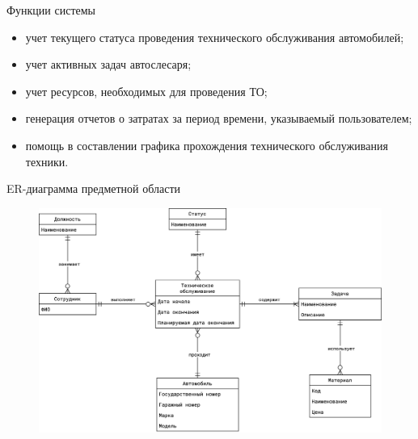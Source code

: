 \documentclass{beamer}
\begin{document}
\begin{frame}
	{Функции системы}
    \begin{itemize}
      \item учет текущего статуса проведения технического обслуживания автомобилей;
      \item учет активных задач автослесаря;
      \item учет ресурсов, необходимых для проведения ТО;
      \item генерация отчетов о затратах за период времени, указываемый
          пользователем;
      \item помощь в составлении графика прохождения технического обслуживания
          техники.
    \end{itemize}
\end{frame}

\begin{frame}
	{ER-диаграмма предметной области}
    \begin{figure}[h]
        \centering
        \includegraphics[keepaspectratio,width=\textwidth]{2/images/er-2.png}
        \label{fig:er-diagram}
    \end{figure}
\end{frame}
\end{document}
